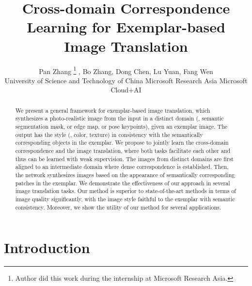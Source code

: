 \documentclass[10pt,twocolumn,letterpaper]{article}
\begin{document}
\newenvironment{absolutelynopagebreak}
{\par\nobreak\vfil\penalty0\vfilneg
	\vtop\bgroup}
{\par\xdef\tpd{\the\prevdepth}\egroup
	\prevdepth=\tpd}

\title{Cross-domain Correspondence Learning for Exemplar-based Image Translation}
\author{Pan Zhang
	\thanks{Author did this work during the internship at Microsoft Research Asia.}
	, Bo Zhang, Dong Chen, Lu Yuan, Fang Wen
	\\
	University of Science and Technology of China \quad
	Microsoft Research Asia \quad  Microsoft Cloud+AI
}


\maketitle
\thispagestyle{empty}

\maketitle
%
 \begin{abstract}
	\vspace{-1em}
We present a general framework for exemplar-based image translation, which synthesizes a photo-realistic image from the input in a distinct domain (\eg, semantic segmentation mask, or edge map, or pose keypoints), given an exemplar image. The output has the style (\eg, color, texture) in consistency with the semantically corresponding objects in the exemplar.
We propose to jointly learn the cross-domain correspondence and the image translation, where both tasks facilitate each other and thus can be learned with weak supervision.
    The images from distinct domains are first aligned to an intermediate domain where dense correspondence is established. Then, the network synthesizes images based on the appearance of semantically corresponding patches in the exemplar.
    We demonstrate the effectiveness of our approach in several image translation tasks. Our method is superior to state-of-the-art methods in terms of image quality significantly, with the image style faithful to the exemplar with semantic consistency. Moreover, we show the utility of our method for several  applications.
    
\end{abstract}
\section{Introduction}
\label{sec:introduction}
\end{document}
